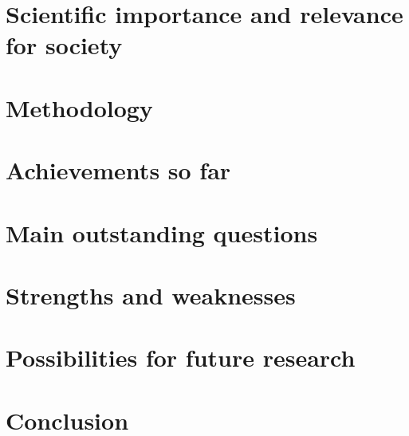 \documentclass[12pt]{article}
\begin{document}
\section{Scientific importance and relevance for society}






\section{Methodology}


\section{Achievements so far}
\section{Main outstanding questions}
\section{Strengths and weaknesses}
\section{Possibilities for future research}
\section{Conclusion}
\end{document}
